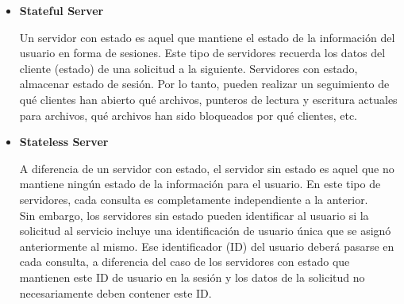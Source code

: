 \documentclass[osajnl,twocolumn,showpacs,superscriptaddress,10pt]{revtex4-1} %
\begin{document}
\begin{itemize}
    \item \textbf{Stateful Server}
    
    Un servidor con estado es aquel que mantiene el estado de la información del usuario en forma de sesiones. Este tipo de servidores recuerda los datos del cliente (estado) de una solicitud a la siguiente. Servidores con estado, almacenar estado de sesión. Por lo tanto, pueden realizar un seguimiento de qué clientes han abierto qué archivos, punteros de lectura y escritura actuales para archivos, qué archivos han sido bloqueados por qué clientes, etc.
    
    \item \textbf{Stateless Server}
    
    A diferencia de un servidor con estado, el servidor sin estado es aquel que no mantiene ningún estado de la información para el usuario. En este tipo de servidores, cada consulta es completamente independiente a la anterior. \\
    Sin embargo, los servidores sin estado pueden identificar al usuario si la solicitud al servicio incluye una identificación de usuario única que se asignó anteriormente al mismo. Ese identificador (ID) del usuario deberá pasarse en cada consulta, a diferencia del caso de los servidores con estado que mantienen este ID de usuario en la sesión y los datos de la solicitud no necesariamente deben contener este ID.
\end{itemize}
\end{document}
